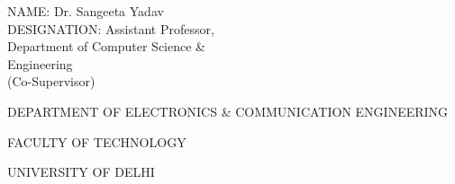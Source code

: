 \begin{titlepage}
{\begin{minipage}[t]{0.42\textwidth}
NAME: Dr. Sangeeta Yadav\\[2pt]
DESIGNATION: Assistant Professor,\\
Department of Computer Science \&\\ Engineering\\[2pt]
(Co-Supervisor)
\end{minipage}\par}
\vfill
{\fontsize{12}{15}\selectfont DEPARTMENT OF ELECTRONICS \& COMMUNICATION ENGINEERING\par}
\vspace{6pt}
{\fontsize{14}{17}\selectfont FACULTY OF TECHNOLOGY\par}
\vspace{4pt}
{\fontsize{14}{17}\selectfont UNIVERSITY OF DELHI\par}
\end{titlepage}

